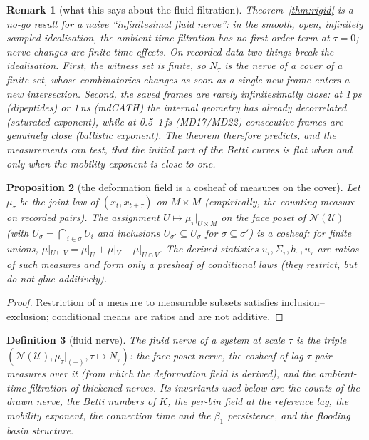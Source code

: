 \documentclass[11pt]{article}
\newtheorem{definition}{Definition}[section]
\newtheorem{proposition}[definition]{Proposition}
\newtheorem{remark}[definition]{Remark}
\newcommand{\N}{\mathcal{N}}
\newcommand{\U}{\mathcal{U}}
\begin{document}
\begin{remark}[what this says about the fluid filtration]
Theorem~\ref{thm:rigid} is a no-go result for a naive ``infinitesimal fluid nerve'': in the smooth, open, infinitely sampled idealisation, the ambient-time filtration has no first-order term at $\tau=0$; nerve changes are finite-time effects. On recorded data two things break the idealisation. First, the witness set is finite, so $N_\tau$ is the nerve of a cover of a finite set, whose combinatorics changes as soon as a single new frame enters a new intersection. Second, the saved frames are rarely infinitesimally close: at 1\,ps (dipeptides) or 1\,ns (mdCATH) the internal geometry has already decorrelated (saturated exponent), while at 0.5--1\,fs (MD17/MD22) consecutive frames are genuinely close (ballistic exponent). The theorem therefore predicts, and the measurements can test, that the initial part of the Betti curves is flat when and only when the mobility exponent is close to one.
\end{remark}

\begin{proposition}[the deformation field is a cosheaf of measures on the cover]
Let $\mu_\tau$ be the joint law of $(x_t,x_{t+\tau})$ on $M\times M$ (empirically, the counting measure on recorded pairs). The assignment $U\mapsto\mu_\tau|_{U\times M}$ on the face poset of $\N(\U)$ (with $U_\sigma=\bigcap_{i\in\sigma}U_i$ and inclusions $U_{\sigma'}\subseteq U_\sigma$ for $\sigma\subseteq\sigma'$) is a cosheaf: for finite unions, $\mu|_{U\cup V}=\mu|_U+\mu|_V-\mu|_{U\cap V}$. The derived statistics $v_\tau,\Sigma_\tau,h_\tau,u_\tau$ are ratios of such measures and form only a presheaf of conditional laws (they restrict, but do not glue additively).
\end{proposition}
\begin{proof}
Restriction of a measure to measurable subsets satisfies inclusion--exclusion; conditional means are ratios and are not additive.
\end{proof}

\begin{definition}[fluid nerve]
The \emph{fluid nerve} of a system at scale $\tau$ is the triple $(\N(\U), \mu_\tau|_{(-)}, \tau\mapsto N_\tau)$: the face-poset nerve, the cosheaf of lag-$\tau$ pair measures over it (from which the deformation field is derived), and the ambient-time filtration of thickened nerves. Its invariants used below are the counts of the drawn nerve, the Betti numbers of $K$, the per-bin field at the reference lag, the mobility exponent, the connection time and the $\beta_1$ persistence, and the flooding basin structure.
\end{definition}
\end{document}

